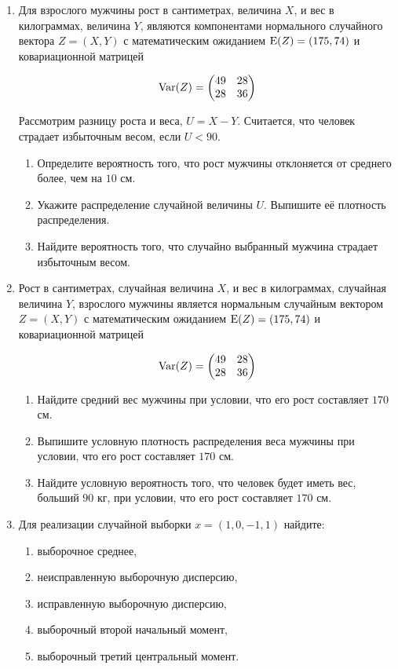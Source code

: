 \begin{enumerate}
\item Для взрослого мужчины рост в сантиметрах, величина $X$, и вес в килограммах,
 величина $Y$, являются компонентами нормального случайного вектора $Z = (X, Y)$
 с математическим ожиданием $\operatorname{E}(Z) = (175, 74)$ и ковариационной матрицей

\[
\operatorname{Var}(Z) =
\begin{pmatrix}
 49 & 28 \\
28 & 36
\end{pmatrix}
\]

Рассмотрим разницу роста и веса, $U = X - Y$.
Считается, что человек страдает избыточным весом, если $U < 90$.

\begin{enumerate}
\item Определите вероятность того, что рост мужчины отклоняется от среднего более, чем на $10$ см.
\item Укажите распределение случайной величины $U$. Выпишите её плотность распределения.
\item Найдите вероятность того, что случайно выбранный мужчина страдает избыточным весом.
\end{enumerate}

\item Рост в сантиметрах, случайная величина $X$, и вес в килограммах,
случайная величина $Y$, взрослого мужчины является нормальным случайным вектором
$Z = (X, Y)$ с математическим ожиданием $\operatorname{E}(Z) = (175, 74)$ и ковариационной матрицей

\[
\operatorname{Var}(Z) =
\begin{pmatrix}
 49 & 28 \\
28 & 36
\end{pmatrix}
\]

\begin{enumerate}
\item Найдите средний вес мужчины при условии, что его рост составляет $170$ см.
\item Выпишите условную плотность распределения веса мужчины при условии, что его рост составляет $170$ см.
\item Найдите условную вероятность того, что человек будет иметь вес, больший $90$ кг, при условии, что его рост составляет $170$ см.
\end{enumerate}

\item Для реализации случайной выборки $x=(1,0,-1,1)$ найдите:

\begin{enumerate}
\item выборочное среднее,
\item неисправленную выборочную дисперсию,
\item исправленную выборочную дисперсию,
\item выборочный второй начальный момент,
\item выборочный третий центральный момент.
\end{enumerate}


\end{enumerate}
